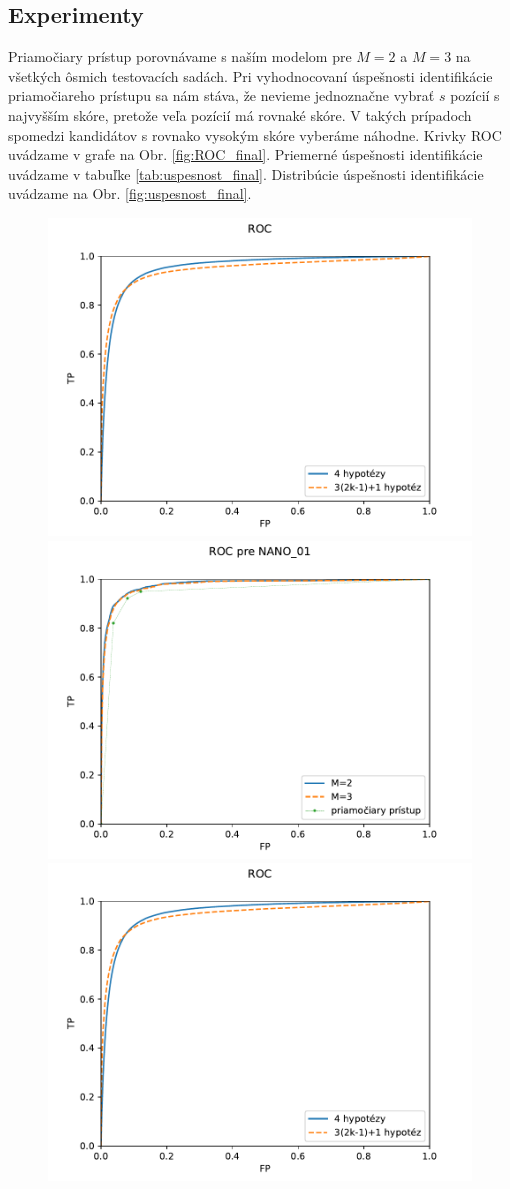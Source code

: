 \subsection{Experimenty}

Priamočiary prístup porovnávame s naším modelom pre $M=2$ a $M=3$ na všetkých ôsmich testovacích sadách.
Pri vyhodnocovaní úspešnosti identifikácie priamočiareho prístupu sa nám stáva, že nevieme jednoznačne
vybrať $s$ pozícií s najvyšším skóre, pretože veľa pozícií má rovnaké skóre. V takých prípadoch spomedzi
kandidátov s rovnako vysokým skóre vyberáme náhodne. Krivky ROC uvádzame v grafe na Obr. \ref{fig:ROC_final}.
Priemerné úspešnosti identifikácie uvádzame v tabuľke \ref{tab:uspesnost_final}. Distribúcie úspešnosti
identifikácie uvádzame na Obr. \ref{fig:uspesnost_final}.
 
 
\begin{figure}[!ht]
   \begin{center}
   \begin{minipage}{\textwidth}
     \centering
     \includegraphics[width=.47\textwidth]{plots/1_ROC}\quad
     \includegraphics[width=.47\textwidth]{plots/6_ROC_nanolution_01}\\
     \includegraphics[width=.47\textwidth]{plots/1_ROC}\quad

\end{minipage}
\end{center}
\end{figure}
